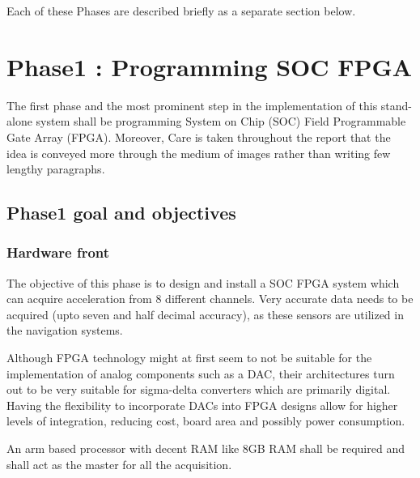 \documentclass{FR16}
\begin{document}
Each of these Phases are described briefly  as a separate section below.
\newpage
\section{Phase1 : Programming SOC FPGA}

The first phase and the most prominent step in the implementation of this stand-alone system shall be programming System on Chip (SOC) Field Programmable Gate Array (FPGA). Moreover, Care is taken throughout
the report that the idea is conveyed more through the medium of images rather than writing few lengthy paragraphs.

\subsection{Phase1 goal and objectives}

\subsubsection{Hardware front}
The objective of this phase is to design and install a SOC FPGA system which can acquire acceleration from 8 different channels. Very accurate data needs to be acquired (upto seven and half decimal accuracy), as these sensors are  utilized in the navigation systems. 

Although FPGA technology might at first seem to not be suitable for the implementation of analog components such as a DAC, their architectures turn out to be very suitable for sigma-delta converters which are primarily digital. Having the flexibility to incorporate DACs into FPGA designs allow for higher levels of integration, reducing cost, board area and possibly power consumption.

An arm based processor with decent RAM like 8GB RAM shall be required and shall act as the master  for all the acquisition.
\end{document}
